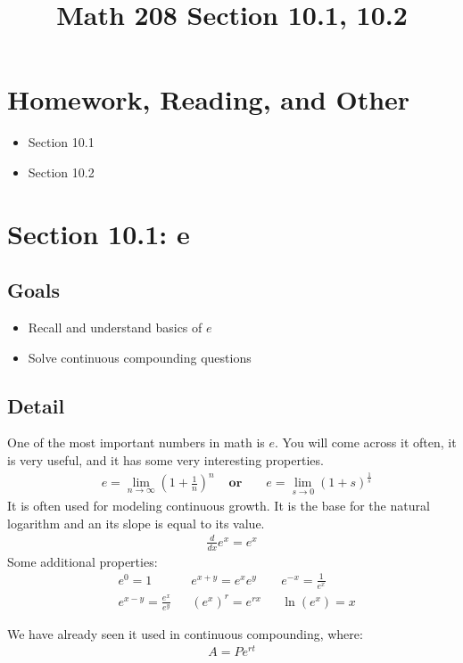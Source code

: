 \documentclass[14pt]{extarticle}
\title{\vspace{-5ex}Math 208 Section 10.1, 10.2}
\date{\vspace{-10ex}}
\begin{document}
	\maketitle		
	\section*{Homework, Reading, and Other}
	\begin{itemize}
		\item Section 10.1
		\item Section 10.2
	\end{itemize}

\section{Section 10.1: e}
\subsection{Goals}
\begin{itemize}
	\item Recall and understand basics of $e$
	\item Solve continuous compounding questions
\end{itemize}
\subsection{Detail}
One  of the most important numbers in math is $e$. You will come across it often, it is very useful, and it has some very interesting properties.
\begin{align*}
	&e = \lim_{n \to \infty} \left(1 + \frac{1}{n}\right)^n &
	\textbf{ or } &
	&e = \lim_{s \to 0} \left(1 + s\right)^{\frac{1}{s}}
\end{align*}
It is often used for modeling continuous growth. It is the base for the natural logarithm and an its slope is equal to its value.
\begin{align*}
	\frac{d}{dx}e^x =  e^x
\end{align*}
Some additional properties:
\begin{align*}
	&e^0 = 1 & &e^{x+y} = e^x e^y & &e^{-x}=\frac{1}{e^x} \\
	&e^{x-y} = \frac{e^x}{e^y }	& &(e^x)^r= e^{rx} & &\ln(e^x) = x
\end{align*}
		

We have already seen it used in continuous compounding, where:
\begin{align*}
	A = Pe^{rt}
\end{align*}
\end{document}
